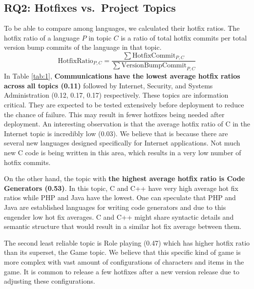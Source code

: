 \documentclass{sig-alternate}
\begin{document}
\subsection{RQ2: Hotfixes vs.\ Project Topics}
To be able to compare among languages, we calculated their hotfix ratios. The hotfix ratio of a language $P$ in topic $C$ is a ratio of total hotfix commits per total version bump commits of the language in that topic. %
\begin{equation*}
\mathrm{HotfixRatio}_{P,C} = \frac{\sum{\mathrm{HotfixCommit}_{P,C}}}{\sum{\mathrm{VersionBumpCommit}_{P,C}}}
\end{equation*}
In Table \ref{tab:1}, \textbf{Communications have the lowest average hotfix ratios across all topics (0.11)} followed by Internet, Security, and Systems Administration (0.12, 0.17, 0.17) respectively. These topics are information critical. They are expected to be tested extensively before deployment to reduce the chance of failure. This may result in fewer hotfixes being needed after deployment. An interesting observation is that the average hotfix ratio of C in the Internet topic is incredibly low (0.03). We believe that is because there are several new languages designed specifically for Internet applications. Not much new C code is being written in this area, which results in a very low number of hotfix commits. %

On the other hand, the topic with \textbf{the highest average hotfix ratio is Code Generators (0.53)}. In this topic, C and C++ have very high average hot fix ratios while  PHP and Java have the lowest. One can speculate that PHP and Java are established languages for writing code generators and due to this engender low hot fix averages. C and C++ might share syntactic details and semantic structure that would result in a similar hot fix average between them. 

The second least reliable topic is Role playing (0.47) which has higher hotfix ratio than its superset, the Game topic. We believe that this specific kind of game is more complex with vast amount of configurations of characters and items in the game. It is common to release a few hotfixes after a new version release due to adjusting these configurations. %
\end{document}
